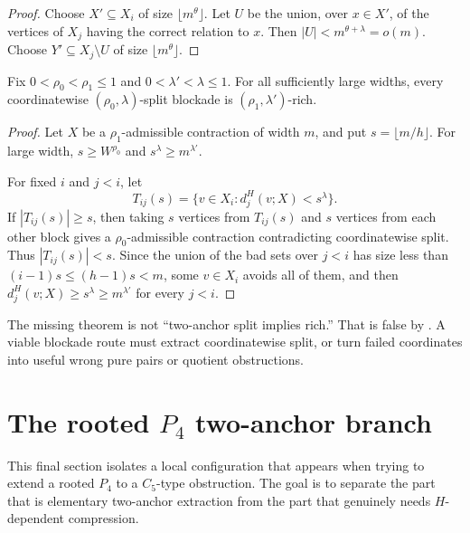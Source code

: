 \begin{proof}
Choose $X'\subseteq X_i$ of size $\lfloor m^\theta\rfloor$. Let $U$ be the union, over $x\in X'$, of the vertices of $X_j$ having the correct relation to $x$. Then $|U|<m^{\theta+\lambda}=o(m)$. Choose $Y'\subseteq X_j\setminus U$ of size $\lfloor m^\theta\rfloor$.
\end{proof}

\begin{proposition}\label{prop:coordinate-synchronizes}
Fix $0<\rho_0<\rho_1\le 1$ and $0<\lambda'<\lambda\le 1$. For all sufficiently large widths, every coordinatewise $(\rho_0,\lambda)$-split blockade is $(\rho_1,\lambda')$-rich.
\end{proposition}

\begin{proof}
Let $X$ be a $\rho_1$-admissible contraction of width $m$, and put $s=\lfloor m/h\rfloor$. For large width, $s\ge W^{\rho_0}$ and $s^\lambda\ge m^{\lambda'}$.

For fixed $i$ and $j<i$, let
\[
  T_{ij}(s)=\{v\in X_i:d^H_j(v;X)<s^\lambda\}.
\]
If $|T_{ij}(s)|\ge s$, then taking $s$ vertices from $T_{ij}(s)$ and $s$ vertices from each other block gives a $\rho_0$-admissible contraction contradicting coordinatewise split. Thus $|T_{ij}(s)|<s$. Since the union of the bad sets over $j<i$ has size less than $(i-1)s\le (h-1)s<m$, some $v\in X_i$ avoids all of them, and then $d^H_j(v;X)\ge s^\lambda\ge m^{\lambda'}$ for every $j<i$.
\end{proof}

\begin{remark}
The missing theorem is not ``two-anchor split implies rich.'' That is false by . A viable blockade route must extract coordinatewise split, or turn failed coordinates into useful wrong pure pairs or quotient obstructions.
\end{remark}

\section{The rooted \texorpdfstring{$P_4$}{P4} two-anchor branch}

This final section isolates a local configuration that appears when trying to extend a rooted $P_4$ to a $C_5$-type obstruction. The goal is to separate the part that is elementary two-anchor extraction from the part that genuinely needs $H$-dependent compression.

